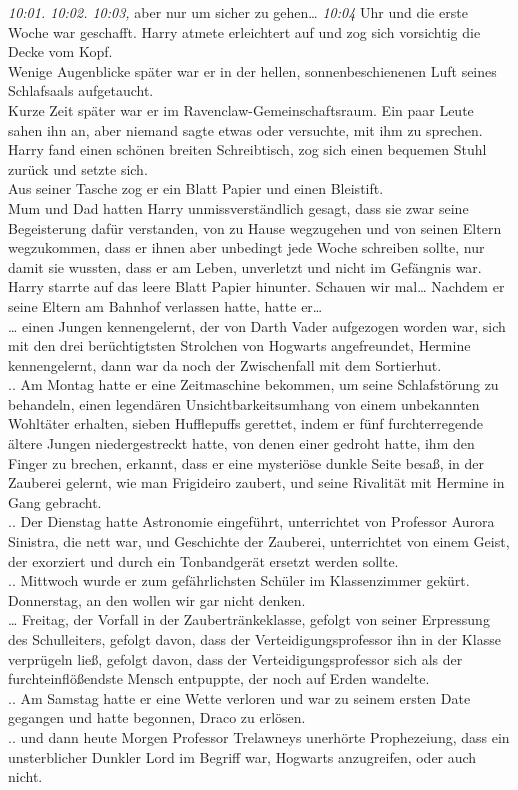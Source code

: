 {\emph{10:01. 10:02. 10:03,} aber nur um sicher zu gehen… \emph{10:04} Uhr und die erste Woche war geschafft. Harry atmete erleichtert auf und zog sich vorsichtig die Decke vom Kopf.\\ Wenige Augenblicke später war er in der hellen, sonnenbeschienenen Luft seines Schlafsaals aufgetaucht.\\ Kurze Zeit später war er im Ravenclaw-Gemeinschaftsraum. Ein paar Leute sahen ihn an, aber niemand sagte etwas oder versuchte, mit ihm zu sprechen.\\ Harry fand einen schönen breiten Schreibtisch, zog sich einen bequemen Stuhl zurück und setzte sich.\\ Aus seiner Tasche zog er ein Blatt Papier und einen Bleistift.\\ Mum und Dad hatten Harry unmissverständlich gesagt, dass sie zwar seine Begeisterung dafür verstanden, von zu Hause wegzugehen und von seinen Eltern wegzukommen, dass er ihnen aber unbedingt jede Woche schreiben sollte, nur damit sie wussten, dass er am Leben, unverletzt und nicht im Gefängnis war.\\ Harry starrte auf das leere Blatt Papier hinunter. Schauen wir mal… Nachdem er seine Eltern am Bahnhof verlassen hatte, hatte er…\\ … einen Jungen kennengelernt, der von Darth Vader aufgezogen worden war, sich mit den drei berüchtigtsten Strolchen von Hogwarts angefreundet, Hermine kennengelernt, dann war da noch der Zwischenfall mit dem Sortierhut.\\ .. Am Montag hatte er eine Zeitmaschine bekommen, um seine Schlafstörung zu behandeln, einen legendären Unsichtbarkeitsumhang von einem unbekannten Wohltäter erhalten, sieben Hufflepuffs gerettet, indem er fünf furchterregende ältere Jungen niedergestreckt hatte, von denen einer gedroht hatte, ihm den Finger zu brechen, erkannt, dass er eine mysteriöse dunkle Seite besaß, in der Zauberei gelernt, wie man Frigideiro zaubert, und seine Rivalität mit Hermine in Gang gebracht.\\ .. Der Dienstag hatte Astronomie eingeführt, unterrichtet von Professor Aurora Sinistra, die nett war, und Geschichte der Zauberei, unterrichtet von einem Geist, der exorziert und durch ein Tonbandgerät ersetzt werden sollte.\\ .. Mittwoch wurde er zum gefährlichsten Schüler im Klassenzimmer gekürt. Donnerstag, an den wollen wir gar nicht denken.\\ … Freitag, der Vorfall in der Zaubertränkeklasse, gefolgt von seiner Erpressung des Schulleiters, gefolgt davon, dass der Verteidigungsprofessor ihn in der Klasse verprügeln ließ, gefolgt davon, dass der Verteidigungsprofessor sich als der furchteinflößendste Mensch entpuppte, der noch auf Erden wandelte.\\ .. Am Samstag hatte er eine Wette verloren und war zu seinem ersten Date gegangen und hatte begonnen, Draco zu erlösen.\\ .. und dann heute Morgen Professor Trelawneys unerhörte Prophezeiung, dass ein unsterblicher Dunkler Lord im Begriff war, Hogwarts anzugreifen, oder auch nicht.

}

